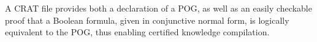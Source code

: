 \documentclass[letterpaper,USenglish,cleveref, autoref, thm-restate]{lipics-v2021}
\newcommand{\nil}{\bot}
\newcommand{\obar}[1]{\overline{#1}}
\begin{document}
A CRAT file provides both a declaration of a POG, as well as an easily checkable
proof that a Boolean formula, given in conjunctive normal
form, is logically equivalent to the POG, thus enabling certified
knowledge compilation.
\end{document}
